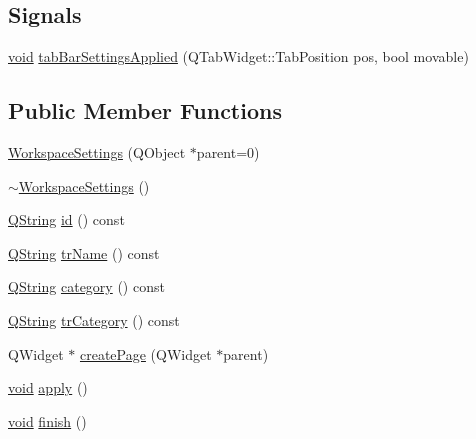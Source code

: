 \subsection*{\-Signals}
\begin{DoxyCompactItemize}
\item 
\hyperlink{group___u_a_v_objects_plugin_ga444cf2ff3f0ecbe028adce838d373f5c}{void} \hyperlink{group___core_plugin_ga7fbca5cfb84fd54afed52b4ca319f887}{tab\-Bar\-Settings\-Applied} (\-Q\-Tab\-Widget\-::\-Tab\-Position pos, bool movable)
\end{DoxyCompactItemize}
\subsection*{\-Public \-Member \-Functions}
\begin{DoxyCompactItemize}
\item 
\hyperlink{group___core_plugin_ga17c90a13ced98ccf424faf0ffe0a9b83}{\-Workspace\-Settings} (\-Q\-Object $\ast$parent=0)
\item 
\hyperlink{group___core_plugin_ga52cc2565aaed4f3542cdeba23e41648f}{$\sim$\-Workspace\-Settings} ()
\item 
\hyperlink{group___u_a_v_objects_plugin_gab9d252f49c333c94a72f97ce3105a32d}{\-Q\-String} \hyperlink{group___core_plugin_ga71ed1ecbadd60bd6d4bb544942aede25}{id} () const 
\item 
\hyperlink{group___u_a_v_objects_plugin_gab9d252f49c333c94a72f97ce3105a32d}{\-Q\-String} \hyperlink{group___core_plugin_gab9597c172a3c0a1ae683edb4c4a3d8c2}{tr\-Name} () const 
\item 
\hyperlink{group___u_a_v_objects_plugin_gab9d252f49c333c94a72f97ce3105a32d}{\-Q\-String} \hyperlink{group___core_plugin_ga09ec0904c7d7ef400eb3251043b2520e}{category} () const 
\item 
\hyperlink{group___u_a_v_objects_plugin_gab9d252f49c333c94a72f97ce3105a32d}{\-Q\-String} \hyperlink{group___core_plugin_ga8ecc36dbd81d6713a27af883d0ae089d}{tr\-Category} () const 
\item 
\-Q\-Widget $\ast$ \hyperlink{group___core_plugin_gabe793109d2a56ccf3f1b1b818f4ae7e3}{create\-Page} (\-Q\-Widget $\ast$parent)
\item 
\hyperlink{group___u_a_v_objects_plugin_ga444cf2ff3f0ecbe028adce838d373f5c}{void} \hyperlink{group___core_plugin_gabfff6f413d139681a9bc4b6d750b2746}{apply} ()
\item 
\hyperlink{group___u_a_v_objects_plugin_ga444cf2ff3f0ecbe028adce838d373f5c}{void} \hyperlink{group___core_plugin_ga3bd655424af374ce67e8c9d36a2fef4c}{finish} ()

\end{DoxyCompactItemize}
